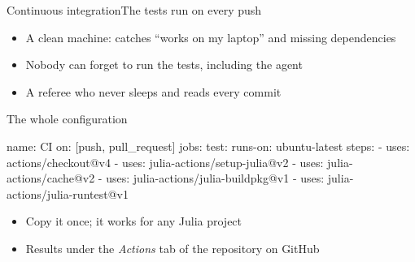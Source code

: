 \begin{frame}{Continuous integration}{The tests run on every push}
  \vspace{2ex}
  \begin{center}
  \end{center}
  \vspace{2ex}

  \begin{itemize}
    \item<2-> A clean machine: catches ``works on my laptop'' and missing dependencies
    \item<3-> Nobody can forget to run the tests, including the agent
    \item<4-> A referee who never sleeps and reads every commit
  \end{itemize}
\end{frame}

\begin{frame}[fragile]{The whole configuration}
\begin{terminal}[title={\hfill\tiny\color{unibasGrey}\smallcapsline{.github/workflows/CI.yml}}]
name: CI
on: [push, pull_request]
jobs:
  test:
    runs-on: ubuntu-latest
    steps:
      - uses: actions/checkout@v4
      - uses: julia-actions/setup-julia@v2
      - uses: julia-actions/cache@v2
      - uses: julia-actions/julia-buildpkg@v1
      - uses: julia-actions/julia-runtest@v1
\end{terminal}
  \begin{itemize}
    \item<2-> Copy it once; it works for any Julia project
    \item<3-> Results under the \emph{Actions} tab of the repository on GitHub
  \end{itemize}
\end{frame}

